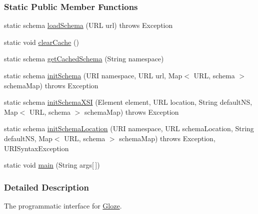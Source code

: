 \subsubsection*{Static Public Member Functions}
\begin{DoxyCompactItemize}
\item 
static schema \hyperlink{classcom_1_1hp_1_1gloze_1_1_gloze_ab90f0fa4ae77452d28c46cd45a083b44}{loadSchema} (URL url)  throws Exception 
\item 
static void \hyperlink{classcom_1_1hp_1_1gloze_1_1_gloze_ac68dbbdb47a624bd15475e0e05f428d8}{clearCache} ()
\item 
static schema \hyperlink{classcom_1_1hp_1_1gloze_1_1_gloze_a215a61b8702140cb4f342140f87bf963}{getCachedSchema} (String namespace)
\item 
static schema \hyperlink{classcom_1_1hp_1_1gloze_1_1_gloze_a02aace1b3f879b77a6ebf2b14c72dac9}{initSchema} (URI namespace, URL url, Map$<$ URL, schema $>$ schemaMap)  throws Exception 
\item 
static schema \hyperlink{classcom_1_1hp_1_1gloze_1_1_gloze_a58ae2633f0436da4c607a6571a2faa81}{initSchemaXSI} (Element element, URL location, String defaultNS, Map$<$ URL, schema $>$ schemaMap)  throws Exception 
\item 
static schema \hyperlink{classcom_1_1hp_1_1gloze_1_1_gloze_ae82f468c04ca83a5f72c6b7570ed804e}{initSchemaLocation} (URI namespace, URL schemaLocation, String defaultNS, Map$<$ URL, schema $>$ schemaMap)  throws Exception, URISyntaxException 
\item 
static void \hyperlink{classcom_1_1hp_1_1gloze_1_1_gloze_af78268830634f6069e1ab4733bb974d3}{main} (String args\mbox{[}$\,$\mbox{]})
\end{DoxyCompactItemize}


\subsubsection{Detailed Description}
The programmatic interface for \hyperlink{classcom_1_1hp_1_1gloze_1_1_gloze}{Gloze}. 

